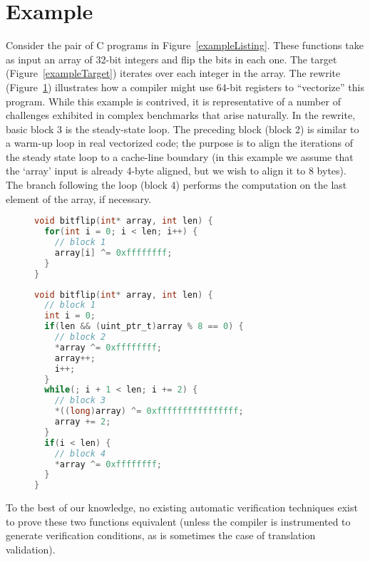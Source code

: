 \section{Example}\label{sec:example}

Consider the pair of C programs in Figure~\ref{exampleListing}. These
functions take as input an array of 32-bit integers and flip the bits
in each one. The target (Figure~\ref{exampleTarget}) iterates over
each integer in the array. The rewrite (Figure~\ref{exampleRewrite})
illustrates how a compiler might use 64-bit registers to ``vectorize''
this program. While this example is contrived, it is representative
of a number of challenges exhibited in complex benchmarks that arise
naturally. In the rewrite, basic block 3 is the steady-state loop.
The preceding block (block 2) is similar to a warm-up loop in real
vectorized code; the purpose is to align the iterations of the steady
state loop to a cache-line boundary (in this example we assume that the `array'
input is already 4-byte aligned, but we wish to align it to 8 bytes). The
branch following the loop (block 4) performs the computation on the
last element of the array, if necessary.

\begin{figure}
\label{exampleListing}
\begin{lstlisting}[language=C]
void bitflip(int* array, int len) {
  for(int i = 0; i < len; i++) {
    // block 1
    array[i] ^= 0xffffffff;
  }
}
\end{lstlisting}
\label{exampleTarget}
\begin{lstlisting}[language=C]
void bitflip(int* array, int len) {
  // block 1
  int i = 0;
  if(len && (uint_ptr_t)array % 8 == 0) {
    // block 2
    *array ^= 0xffffffff;
    array++;
    i++;
  } 
  while(; i + 1 < len; i += 2) {
    // block 3
    *((long)array) ^= 0xffffffffffffffff;
    array += 2;
  }
  if(i < len) {
    // block 4
    *array ^= 0xffffffff;
  }
}
\end{lstlisting}
\label{exampleRewrite}
\end{figure}

To the best of our knowledge, no existing automatic verification
techniques exist to prove these two functions equivalent (unless the
compiler is instrumented to generate verification conditions, as is
sometimes the case of translation validation).

